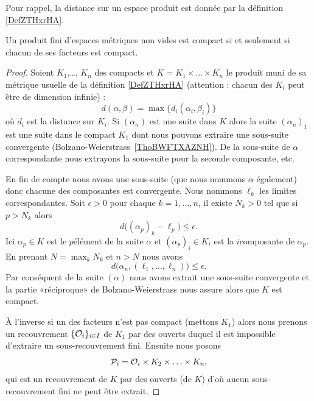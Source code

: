 Pour rappel, la distance sur un espace produit est donnée par la définition \ref{DefZTHxrHA}.
\begin{theorem}\label{THOIYmxXuu}
    Un produit fini d'espaces métriques non vides est compact si et seulement si chacun de ses facteurs est compact.
\end{theorem}

\begin{proof}
    Soient \( K_1\),\ldots, \( K_n\) des compacts et \( K=K_1\times \ldots\times K_n\) le produit muni de sa métrique usuelle de la définition \eqref{DefZTHxrHA} (attention : chacun des \( K_i\) peut être de dimension infinie) :
    \begin{equation}
        d(\alpha,\beta)=\max\{ d_i(\alpha_i,\beta_i) \}
    \end{equation}
    où \( d_i\) est la distance sur \( K_i\). Si \( (\alpha_n)\) est une suite dans \( K\) alors la suite \( (\alpha_n)_1\) est une suite dans le compact \( K_1\) dont nous pouvons extraire une sous-suite convergente (Bolzano-Weierstrass~\ref{ThoBWFTXAZNH}). De la sous-suite de \( \alpha\) correspondante nous extrayons la sous-suite pour la seconde composante, etc.

    En fin de compte nous avons une sous-suite (que nous nommons \( \alpha\) également) donc chacune des composantes est convergente. Nous nommons \( \ell_k\) les limites correspondantes. Soit \( \epsilon>0\) pour chaque \( k=1,\ldots, n\), il existe \( N_k>0\) tel que si \( p>N_k\) alors
    \begin{equation}
        d\big( (\alpha_p)_k-\ell_p \big)\leq \epsilon.
    \end{equation}
    Ici \( \alpha_p\in K\) est le \( p\)\ieme élément de la suite \( \alpha\) et \( (\alpha_p)_i\in K_i\) est la \( i\)\ieme composante de \( \alpha_p\). En prenant \( N=\max_kN_k\) et \( n>N\) nous avons
    \begin{equation}
        d\big( \alpha_n,(\ell_1,\ldots, \ell_n) \big)\leq\epsilon.
    \end{equation}
    Par conséquent de la suite \( (\alpha)\) nous avons extrait une sous-suite convergente et la partie «réciproque» de Bolzano-Weierstrass nous assure alors que \( K\) est compact.

    À l'inverse si un des facteurs n'est pas compact (mettons \( K_1\)) alors nous prenons un recouvrement \( \{ \mathcal{O}_i \}_{i\in I}\) de \( K_1\) par des ouverts duquel il est impossible d'extraire un sous-recouvrement fini. Ensuite nous posons
    \begin{equation}
        \mathcal{P}_i=\mathcal{O}_i\times K_2\times\ldots\times K_n,
    \end{equation}
    qui est un recouvrement de \( K\) par des ouverts (de \( K\)) d'où aucun sous-recouvrement fini ne peut être extrait.
\end{proof}


